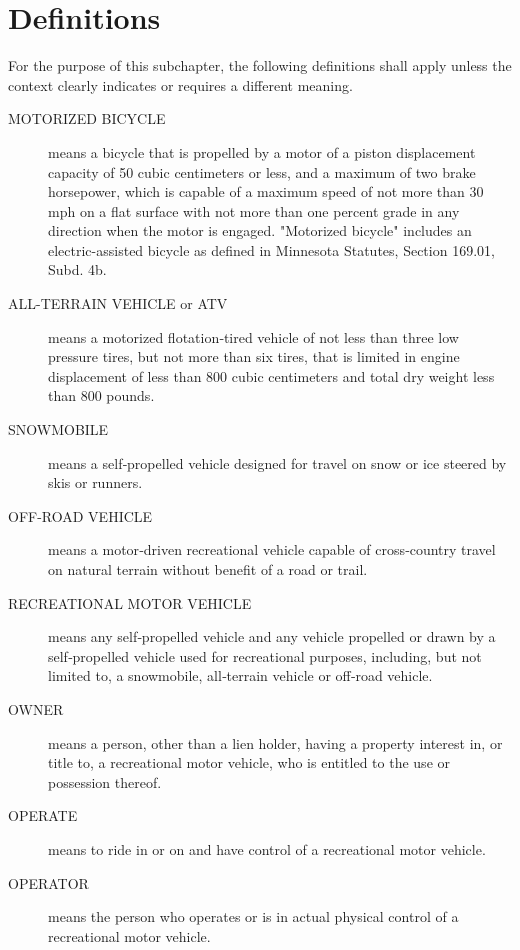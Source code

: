 \documentclass[code.tex]{subfiles}
\begin{document}
\section{Definitions}
For the purpose of this subchapter, the following definitions shall apply unless the context clearly indicates or requires a different meaning.
\begin{description}
\item[MOTORIZED BICYCLE] means a bicycle that is propelled by a motor of a piston displacement capacity of 50 cubic centimeters or less, and a maximum of two brake horsepower, which is capable of a maximum speed of not more than 30 mph on a flat surface with not more than one percent grade in any direction when the motor is engaged. "Motorized bicycle" includes an electric-assisted bicycle as defined in Minnesota Statutes, Section 169.01, Subd. 4b.
\item[ALL-TERRAIN VEHICLE or ATV] means a motorized flotation‑tired vehicle of not less than three low pressure tires, but not more than six tires, that is limited in engine displacement of less than 800 cubic centimeters and total dry weight less than 800 pounds.
\item[SNOWMOBILE] means a self‑propelled vehicle designed for travel on snow or ice steered by skis or runners.
\item[OFF-ROAD VEHICLE] means a motor‑driven recreational vehicle capable of cross‑country travel on natural terrain without benefit of a road or trail.
\item[RECREATIONAL MOTOR VEHICLE] means any self‑propelled vehicle and any vehicle propelled or drawn by a self‑propelled vehicle used for recreational purposes, including, but not limited to, a snowmobile, all‑terrain vehicle or off‑road vehicle.
\item[OWNER] means a person, other than a lien holder, having a property interest in, or title to, a recreational motor vehicle, who is entitled to the use or possession thereof.
\item[OPERATE] means to ride in or on and have control of a recreational motor vehicle.
\item[OPERATOR] means the person who operates or is in actual physical control of a recreational motor vehicle.
\end{description}
\end{document}
